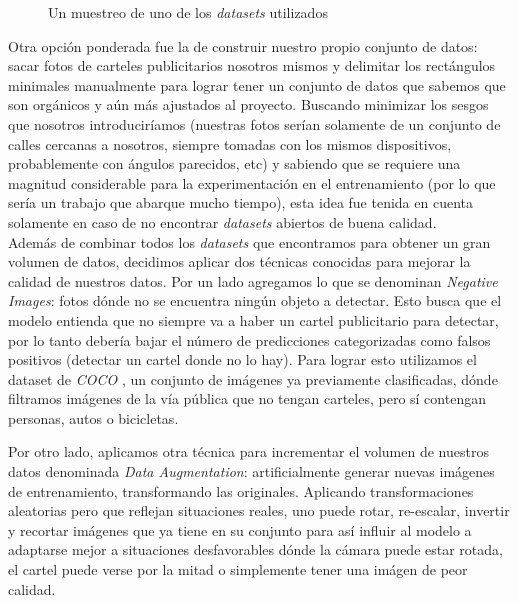 \documentclass[a4paper]{article}
\begin{document}
\begin{figure}[H]
\caption{Un muestreo de uno de los \textit{datasets} utilizados}
\end{figure}

Otra opción ponderada fue la de construir nuestro propio conjunto de datos: sacar fotos de carteles publicitarios nosotros mismos y delimitar los rectángulos minimales manualmente para lograr tener un conjunto de datos que sabemos que son orgánicos y aún más ajustados al proyecto. Buscando minimizar los sesgos que nosotros introduciríamos (nuestras fotos serían solamente de un conjunto de calles cercanas a nosotros, siempre tomadas con los mismos dispositivos, probablemente con ángulos parecidos, etc) y sabiendo que se requiere una magnitud considerable para la experimentación en el entrenamiento (por lo que sería un trabajo que abarque mucho tiempo), esta idea fue tenida en cuenta solamente en caso de no encontrar \textit{datasets} abiertos de buena calidad. \\

Además de combinar todos los \textit{datasets} que encontramos para obtener un gran volumen de datos, decidimos aplicar dos técnicas conocidas para mejorar la calidad de nuestros datos. Por un lado agregamos lo que se denominan \textit{Negative Images}: fotos dónde no se encuentra ningún objeto a detectar. Esto busca que el modelo entienda que no siempre va a haber un cartel publicitario para detectar, por lo tanto debería bajar el número de predicciones categorizadas como falsos positivos (detectar un cartel donde no lo hay). Para lograr esto utilizamos el dataset de \textit{COCO} \cite{coco}, un conjunto de imágenes ya previamente clasificadas, dónde filtramos imágenes de la vía pública que no tengan carteles, pero sí contengan personas, autos o bicicletas.

Por otro lado, aplicamos otra técnica para incrementar el volumen de nuestros datos denominada \textit{Data Augmentation}: artificialmente generar nuevas imágenes de entrenamiento, transformando las originales. Aplicando transformaciones aleatorias pero que reflejan situaciones reales, uno puede rotar, re-escalar, invertir y recortar imágenes que ya tiene en su conjunto para así influir al modelo a adaptarse mejor a situaciones desfavorables dónde la cámara puede estar rotada, el cartel puede verse por la mitad o simplemente tener una imágen de peor calidad.
\end{document}
